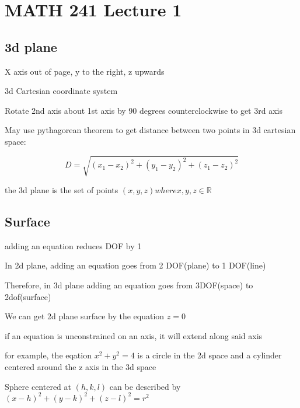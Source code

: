\documentclass[12pt]{report}
\begin{document}
\chapter*{MATH 241 Lecture 1}
\section*{3d plane}
X axis out of page, y to the right, z upwards

3d Cartesian coordinate system

Rotate 2nd axis about 1st axis by 90 degrees counterclockwise to get 3rd axis

May use pythagorean theorem to get distance between two points in 3d cartesian space:

$$D = \sqrt{(x_1 - x_2)^2 + (y_1 - y_2)^2 + (z_1 - z_2)^2}$$

the 3d plane is the set of points $(x,y,z) where x,y,z \in \mathbb{R}$

\section*{Surface}
adding an equation reduces DOF by 1

In 2d plane, adding an equation goes from 2 DOF(plane) to 1 DOF(line)

Therefore, in 3d plane adding an equation goes from 3DOF(space) to 2dof(surface)

We can get 2d plane surface by the equation $z=0$

if an equation is unconstrained on an axis, it will extend along said axis

for example, the eqation $x^2 + y^2 = 4$ is a circle in the 2d space and a cylinder centered around the z axis in the 3d space

Sphere centered at $(h,k,l)$ can be described by $(x-h)^2 + (y-k)^2 + (z-l)^2 = r^2$
\end{document}
